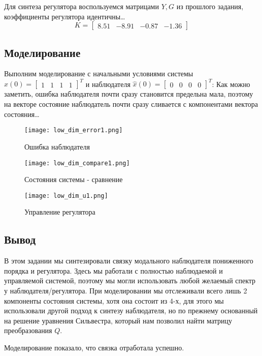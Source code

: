 Для синтеза регулятора воспользуемся матрицами $Y,G$ из прошлого задания, коэффициенты регулятора идентичны\dots
$$
K = 
\begin{bmatrix}
  8.51 & -8.91 & -0.87 & -1.36
\end{bmatrix}
$$

\subsection{Моделирование}
Выполним моделирование с начальными условиями системы 
$x(0) = \begin{bmatrix} 1 & 1 & 1 & 1\end{bmatrix}^T$ и наблюдателя 
$\hat{x}(0) = \begin{bmatrix} 0 & 0 & 0 & 0 \end{bmatrix}^T$:
Как можно заметить, ошибка наблюдателя почти сразу становится предельна мала, 
поэтому на векторе состояние наблюдатель почти сразу сливается с компонентами вектора состояния\dots


\begin{figure}[ht]
  \centering
  \texttt{[image: low\_dim\_error1.png]}
  \caption{Ошибка наблюдателя}
\end{figure}
\newpage
\begin{figure}[ht]
  \centering
  \texttt{[image: low\_dim\_compare1.png]}
  \caption{Состояния системы - сравнение}
\end{figure}
\begin{figure}[ht]
  \centering
  \texttt{[image: low\_dim\_u1.png]}
  \caption{Управление регулятора}
\end{figure}
\newpage
\subsection{Вывод}

В этом задании мы синтезировали связку модального наблюдателя пониженного порядка и регулятора. 
Здесь мы работали с полностью наблюдаемой и управляемой системой, поэтому мы могли использовать любой желаемый спектр у наблюдателя/регулятора.
При моделировании мы отслеживали всего лишь 2 компоненты состояния системы, хотя она состоит из 4-х, 
для этого мы использовали другой подход к синтезу наблюдателя, но по прежнему основанный 
на решение уравнения Сильвестра, который нам позволил найти матрицу преобразования $Q$. 

Моделирование показало, что связка отработала успешно.

\endinput
